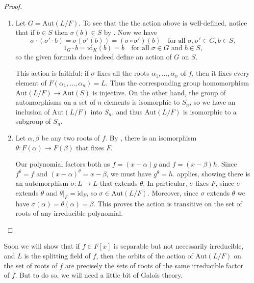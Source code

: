 \documentclass[12pt]{report}
\numberwithin{equation}{section}
\numberwithin{theorem}{chapter}
\theoremstyle{definition}
\newtheorem*{basic properties}{Basic Properties}
\newtheorem*{Important Remark}{Important Remark}
\begin{document}
\begin{proof}$\,$
\begin{enumerate}[label=\alph*),leftmargin=15pt]
\item Let $G=\mathrm{Aut}(L/F)$. To see that the the action above is well-defined, notice that if $b\in S$ then $\sigma(b)\in S$ by . Now we have
$$\sigma \cdot (\sigma'\cdot b) = \sigma(\sigma' (b)) = (\sigma\circ\sigma')(b) \quad \textrm{for all } \sigma,\sigma' \in G, b\in S,$$
$$1_G\cdot b=\mathrm{id}_K(b)=b \quad  \textrm{for all } \sigma \in G \textrm{ and } b\in S,$$
so the given formula does indeed define an action of $G$ on $S$.

This action is faithful: if $\sigma$ fixes all the roots $\alpha_1, \dots, \alpha_n$ of $f$, then it fixes every element of $F(\alpha_1, \dots, \alpha_n) = L$. Thus the corresponding group homomorphism $\mathrm{Aut}(L/F) \to \mathrm{Aut}(S)$ is injective. On the other hand, the group of automorphisms on a set of $n$ elements is isomorphic to $S_n$, so we have an inclusion of $\mathrm{Aut}(L/F)$ into $S_n$, and thus $\mathrm{Aut}(L/F)$ is isomorphic to a subgroup of $S_n$.

\item Let $\alpha, \beta$ be any two roots of $f$. By , there is an isomorphism $\theta\!: F(\alpha) \to F(\beta)$ that fixes $F$. 

Our polynomial factors both as $f = (x-\alpha)g$ and $f = (x-\beta) h$. Since $f^\theta = f$ and $(x-\alpha)^\theta = x -\beta$, we must have $g^\theta = h$.  applies, showing there is an automorphism
$\sigma: L \to L$ that extends $\theta$. In particular, $\sigma$ fixes $F$, since $\sigma$ extends $\theta$ and $\theta|_F = \mathrm{id}_F$, so $\sigma \in \mathrm{Aut}(L/F)$. Moreover, since $\sigma$ extends $\theta$ we have $\sigma(\alpha) = \theta(\alpha) = \beta$. This proves the action is transitive on the set of roots of any irreducible polynomial.\qedhere
\end{enumerate}
\end{proof}



Soon we will show that if $f \in F[x]$ is separable but not necessarily irreducible, and $L$ is the splitting field of $f$, then the orbits of the action of $\mathrm{Aut}(L/F)$ on the set of roots of $f$ are precisely the sets of roots of the same irreducible factor of $f$. But to do so, we will need a little bit of Galois theory.
\end{document}

